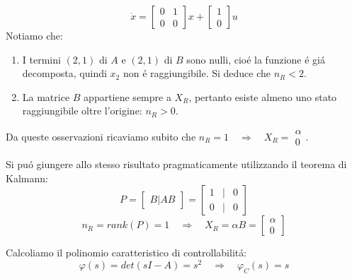 \documentclass[../main.tex]{subfiles}
\begin{document}
		\begin{Exercise}[title={Calcolare $ X_R $ e $ \varphi_C(s) $}, difficulty=1]
			\[
			\dot x =
			\begin{bmatrix}
			0 & 1\\
			0 & 0
			\end{bmatrix} x+
			\begin{bmatrix}
			1\\
			0
			\end{bmatrix} u
			\]
			Notiamo che:
			\begin{enumerate}
				\item
				I termini $ (2,1) $ di $ A $ e $ (2,1) $ di $ B $ sono nulli, cio\'e la funzione \'e gi\'a decomposta, quindi $ x_2 $ non \'e raggiungibile. Si deduce che $ n_R < 2 $.
				\item
				La matrice $ B $ appartiene sempre a $ X_R $, pertanto esiste almeno uno stato raggiungibile oltre l'origine: $ n_R > 0 $.
			\end{enumerate}
			Da queste osservazioni ricaviamo subito che $ n_R = 1 \quad\Rightarrow\quad X_R = \begin{smallmatrix} \alpha\\ 0 \end{smallmatrix} $.
			
			Si pu\'o giungere allo stesso risultato pragmaticamente utilizzando il teorema di Kalmann:
			\[
				P =
				\begin{bmatrix}
					B | AB
				\end{bmatrix} =
				\begin{bmatrix}
					1 & | & 0\\
					0 & | & 0
				\end{bmatrix}
			\]
			\[
				n_R = rank\left( P \right) = 1 \quad\Rightarrow\quad X_R = \alpha B =
				\begin{bmatrix}
					\alpha\\
					0
				\end{bmatrix}
			\]
			
			Calcoliamo il polinomio caratteristico di controllabilit\'a:
			\[ \varphi(s) = det(sI-A) = s^2 \quad\Rightarrow\quad \varphi_C(s) = s \]
		\end{Exercise}
	
\end{document}
